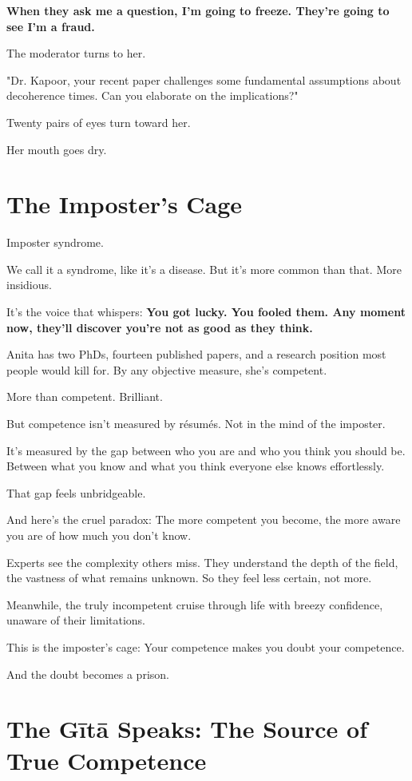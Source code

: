 \documentclass[11pt,twoside]{book}
\begin{document}
\textbf{When they ask me a question, I'm going to freeze. They're going to see I'm a fraud.}

The moderator turns to her.

"Dr. Kapoor, your recent paper challenges some fundamental assumptions about decoherence times. Can you elaborate on the implications?"

Twenty pairs of eyes turn toward her.

Her mouth goes dry.

\section*{The Imposter's Cage}

Imposter syndrome.

We call it a syndrome, like it's a disease. But it's more common than that. More insidious.

It's the voice that whispers: \textbf{You got lucky. You fooled them. Any moment now, they'll discover you're not as good as they think.}

Anita has two PhDs, fourteen published papers, and a research position most people would kill for. By any objective measure, she's competent.

More than competent. Brilliant.

But competence isn't measured by résumés. Not in the mind of the imposter.

It's measured by the gap between who you are and who you think you should be. Between what you know and what you think everyone else knows effortlessly.

That gap feels unbridgeable.

And here's the cruel paradox: The more competent you become, the more aware you are of how much you don't know.

Experts see the complexity others miss. They understand the depth of the field, the vastness of what remains unknown. So they feel less certain, not more.

Meanwhile, the truly incompetent cruise through life with breezy confidence, unaware of their limitations.

This is the imposter's cage: Your competence makes you doubt your competence.

And the doubt becomes a prison.

\section*{The Gītā Speaks: The Source of True Competence}
\end{document}
